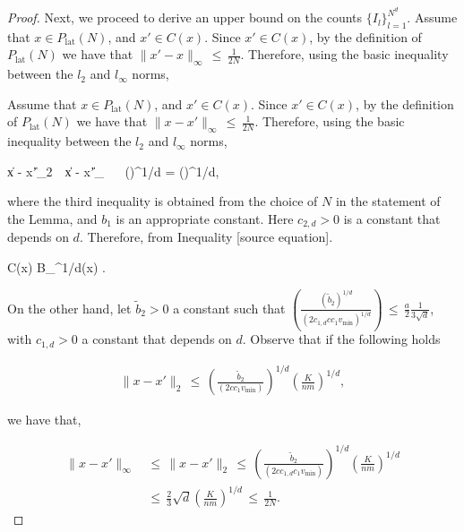 \documentclass[twoside,11pt]{article}
\makeatletter
\newcommand{\discardlabel}[1]{}
\newcommand{\discardtwo}[2]{}
\newcommand{\legacyref}[1]{\textup{[source ref.]}}
\newcommand{\legacyeqref}[1]{\textup{[source equation]}}
\newenvironment{legacycomparison}{%
  \begingroup\color{legacygray}%
  \let\label\discardlabel
  \let\originallabel\discardlabel
  \let\ref\legacyref
  \let\pageref\legacyref
  \let\eqref\legacyeqref
  \let\cref\legacyref
  \let\Cref\legacyref
  \let\autoref\legacyref
  \let\aliasref\discardtwo
}{\endgroup}
\newcommand{\aliasref}[2]{%
  \@ifundefined{r@#2}{}{%
    \expandafter\let\csname r@#1\expandafter\endcsname\csname r@#2\endcsname}}
\makeatother
\begin{document}
\begin{legacycomparison}
\begin{proof}
Next, we proceed to derive an upper bound on the counts \(\{I_{l}\}_{l=1}^{N^d}\). Assume that \(x \in P_{\text{lat}}(N)\), and \(x' \in C(x)\). Since \(x' \in C(x)\), by the definition of \(P_{\text{lat}}(N)\) we have that \(\|x' - x\|_\infty \,\leq\, \frac{1}{2N}\). Therefore, using the basic inequality between the \(l_2\) and \(l_\infty\) norms,


Assume that \(x \in P_{\text{lat}}(N)\), and \(x' \in C(x)\). Since \(x' \in C(x)\), by the definition of \(P_{\text{lat}}(N)\) we have that \(\|x - x'\|_{\infty} \,\leq\, \frac{1}{2N}\). Therefore, using the basic inequality between the \(l_2\) and \(l_{\infty}\) norms,

\beq 
\label{eq:291__duplicate3}
\|x - x'\|_2 \,\leq\,  \|x - x'\|_{\infty} \,\leq\,  \,\leq\,   \left(\right)^{1/d}  = \left(\right)^{1/d},
\beq 

where the third inequality is obtained from the choice of \(N\) in the statement of the Lemma, and \(b_1\) is an appropriate constant. Here \(c_{2,d} > 0\) is a constant that depends on \(d\). Therefore, from Inequality \eqref{eq:291}.


\beq 
\label{eq:292}
C(x) \subseteq B_{^{1/d}}(x) .
\beq   



On the other hand, let $\tilde{b}_2 > 0$ a constant such that $\left( \frac{(\tilde{b}_2)^{1/d}}{(2c_{1,d}c c_1 v_{\text{min}})^{1/d}} \right) \,\leq\, \frac{a}{2}\frac{1}{3\sqrt{d}} $, with $c_{1,d} > 0$ a constant that depends on $d$. Observe that if the following holds

\begin{align}
   \|x - x'\|_2 \,\leq\,  \left( \frac{\tilde{b}_2}{(2cc_1v_{\text{min}})} \right)^{1/d} \left( \frac{K}{nm} \right)^{1/d}, 
\end{align}

we have that,

\begin{align}
    \|x - x'\|_{\infty} &\,\leq\, \|x - x'\|_2 \,\leq\, \left( \frac{\tilde{b}_2}{(2cc_{1,d}c_1v_{\text{min}})} \right)^{1/d} \left( \frac{K}{nm} \right)^{1/d} \nonumber \\
    &\,\leq\, \frac{2}{3} \sqrt{d} \left( \frac{K}{nm} \right)^{1/d} \,\leq\, \frac{1}{2N}. \label{eq:295}
\end{align}


\end{proof}
\end{legacycomparison}
\end{document}

